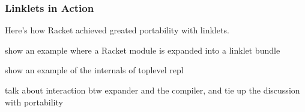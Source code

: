 \subsubsection{Linklets in Action}

Here's how Racket achieved greated portability with linklets.


show an example where a Racket module is expanded into a linklet
bundle

show an example of the internals of toplevel repl

talk about interaction btw expander and the compiler, and tie up the
discussion with portability
